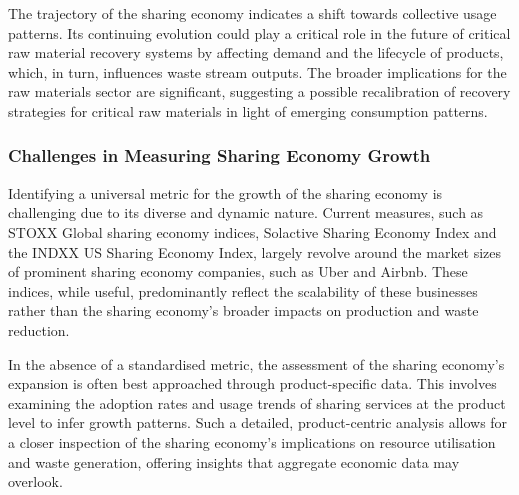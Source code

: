 The trajectory of the sharing economy indicates a shift towards collective
usage patterns. Its continuing evolution could play a critical role in the
future of critical raw material recovery systems by affecting demand and the
lifecycle of products, which, in turn, influences waste stream outputs. The
broader implications for the raw materials sector are significant, suggesting a
possible recalibration of recovery strategies for critical raw materials in
light of emerging consumption patterns.

\subsubsection{Challenges in Measuring Sharing Economy Growth}

Identifying a universal metric for the growth of the sharing economy is
challenging due to its diverse and dynamic nature. Current measures, such as
STOXX Global sharing economy indices, Solactive Sharing Economy Index and the
INDXX US Sharing Economy Index, largely revolve around the market sizes of
prominent sharing economy companies, such as Uber and Airbnb. These indices,
while useful, predominantly reflect the scalability of these businesses rather
than the sharing economy's broader impacts on production and waste reduction.

In the absence of a standardised metric, the assessment of the sharing
economy's expansion is often best approached through product-specific data.
This involves examining the adoption rates and usage trends of sharing services
at the product level to infer growth patterns. Such a detailed, product-centric
analysis allows for a closer inspection of the sharing economy's implications
on resource utilisation and waste generation, offering insights that aggregate
economic data may overlook.

\sectionEndlines
\clearpage